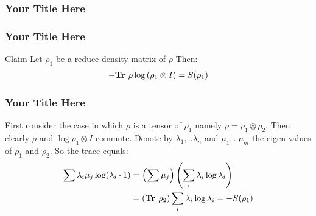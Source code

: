 \documentclass{beamer}
\begin{document}
\begin{frame}
  \frametitle{Your Title Here}
\end{frame}
\begin{frame}
  \frametitle{Your Title Here}
  
\begin{block}{Claim}
  Let $\rho_{1}$ be a reduce density matrix of $\rho$ Then:  
  \begin{equation*}
    \begin{split}
      - \textbf{Tr } \rho \log \left( \rho_{1} \otimes I \right)= S(\rho_{1})
    \end{split}
  \end{equation*}
\end{block}
\end{frame}
\begin{frame}
  \frametitle{Your Title Here}
  First consider the case in which $\rho$ is a tensor of $\rho_{1}$ namely $\rho = \rho_{1} \otimes \rho_{2}$, Then clearly $\rho$ and $\log \rho_{1} \otimes I$ commute. 
  Denote by $\lambda_{1},..\lambda_{n}$ and $\mu_{1},..\mu_{m}$ the eigen values of $\rho_{1}$ and $\rho_2$. So the trace equals: 
  \begin{equation*}
    \begin{split}
      \sum \lambda_{i}\mu_{j}\log(\lambda_{i} \cdot 1) &= \left( \sum \mu_{j} \right) \left( \sum_i \lambda_{i} \log \lambda_{i} \right) \\
      &= \left( \textbf{Tr } \rho_{2} \right) \sum_i \lambda_{i} \log \lambda_{i} = -S(\rho_{1})
    \end{split}
  \end{equation*}
\end{frame}
\end{document}
